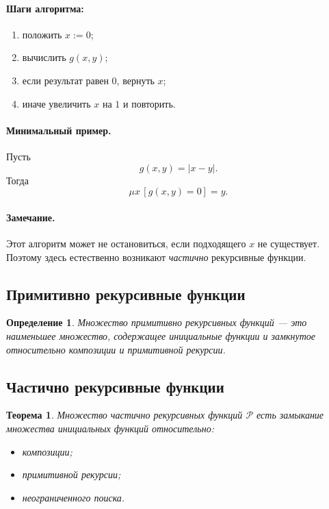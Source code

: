 \documentclass[12pt,a4paper]{article}
\newtheorem{definition}{Определение}
\newtheorem{theorem}{Теорема}
\begin{document}
\paragraph{Шаги алгоритма:}
\begin{enumerate}
    \item положить $x:=0$;
    \item вычислить $g(x,y)$;
    \item если результат равен $0$, вернуть $x$;
    \item иначе увеличить $x$ на $1$ и повторить.
\end{enumerate}

\paragraph{Минимальный пример.}
Пусть
\[
g(x,y)=|x-y|.
\]
Тогда
\[
\mu x\,[g(x,y)=0]=y.
\]

\paragraph{Замечание.}
Этот алгоритм может не остановиться, если подходящего $x$ не существует. Поэтому здесь естественно возникают \emph{частично} рекурсивные функции.

\subsection{Примитивно рекурсивные функции}
\begin{definition}
Множество примитивно рекурсивных функций --- это наименьшее множество, содержащее инициальные функции и замкнутое относительно композиции и примитивной рекурсии.
\end{definition}

\subsection{Частично рекурсивные функции}
\begin{theorem}
Множество частично рекурсивных функций $\mathcal P$ есть замыкание множества инициальных функций относительно:
\begin{itemize}
    \item композиции;
    \item примитивной рекурсии;
    \item неограниченного поиска.
\end{itemize}
\end{theorem}
\end{document}
